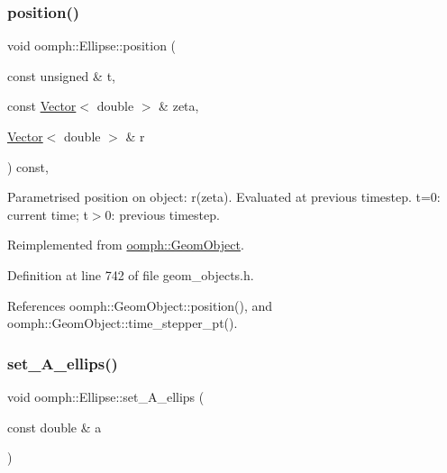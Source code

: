 \subsubsection{\texorpdfstring{position()}{position()}\hspace{0.1cm}{\footnotesize\ttfamily [2/2]}}
{\footnotesize\ttfamily void oomph\+::\+Ellipse\+::position (\begin{DoxyParamCaption}\item[{const unsigned \&}]{t,  }\item[{const \hyperlink{classoomph_1_1Vector}{Vector}$<$ double $>$ \&}]{zeta,  }\item[{\hyperlink{classoomph_1_1Vector}{Vector}$<$ double $>$ \&}]{r }\end{DoxyParamCaption}) const\hspace{0.3cm}{\ttfamily [inline]}, {\ttfamily [virtual]}}



Parametrised position on object\+: r(zeta). Evaluated at previous timestep. t=0\+: current time; t$>$0\+: previous timestep. 



Reimplemented from \hyperlink{classoomph_1_1GeomObject_ad44a736d23dcd63af163a7d80b5c4dfa}{oomph\+::\+Geom\+Object}.



Definition at line 742 of file geom\+\_\+objects.\+h.



References oomph\+::\+Geom\+Object\+::position(), and oomph\+::\+Geom\+Object\+::time\+\_\+stepper\+\_\+pt().

\mbox{\label{classoomph_1_1Ellipse_a703231f987e418849146258eba183eb7}} 
\subsubsection{\texorpdfstring{set\+\_\+\+A\+\_\+ellips()}{set\_A\_ellips()}}
{\footnotesize\ttfamily void oomph\+::\+Ellipse\+::set\+\_\+\+A\+\_\+ellips (\begin{DoxyParamCaption}\item[{const double \&}]{a }\end{DoxyParamCaption})\hspace{0.3cm}{\ttfamily [inline]}}



